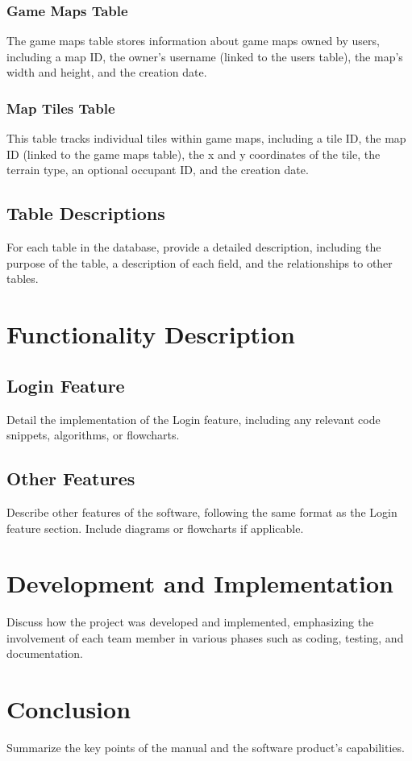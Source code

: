 \documentclass[12pt]{article}
\begin{document}
\subsubsection{Game Maps Table}
The game \textunderscore maps table stores information about game maps owned by users, including a map ID, the owner's username (linked to the users table), the map's width and height, and the creation date.

\subsubsection{Map Tiles Table}
This table tracks individual tiles within game maps, including a tile ID, the map ID (linked to the game \textunderscore maps table), the x and y coordinates of the tile, the terrain type, an optional occupant ID, and the creation date.

\subsection{Table Descriptions}
For each table in the database, provide a detailed description, including the purpose of the table, a description of each field, and the relationships to other tables.

\section{Functionality Description}
\subsection{Login Feature}
Detail the implementation of the Login feature, including any relevant code snippets, algorithms, or flowcharts.

\subsection{Other Features}
Describe other features of the software, following the same format as the Login feature section. Include diagrams or flowcharts if applicable.

\section{Development and Implementation}
Discuss how the project was developed and implemented, emphasizing the involvement of each team member in various phases such as coding, testing, and documentation.

\section{Conclusion}
Summarize the key points of the manual and the software product's capabilities.
\end{document}
